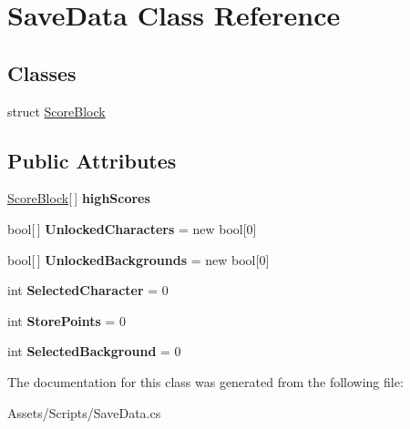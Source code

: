 \hypertarget{class_save_data}{}\section{Save\+Data Class Reference}
\label{class_save_data}
\subsection*{Classes}
\begin{DoxyCompactItemize}
\item 
struct \hyperlink{struct_save_data_1_1_score_block}{Score\+Block}
\end{DoxyCompactItemize}
\subsection*{Public Attributes}
\begin{DoxyCompactItemize}
\item 
\hyperlink{struct_save_data_1_1_score_block}{Score\+Block}\mbox{[}$\,$\mbox{]} {\bfseries high\+Scores}\hypertarget{class_save_data_ad6b597fae588561b2cab802255210781}{}\label{class_save_data_ad6b597fae588561b2cab802255210781}

\item 
bool\mbox{[}$\,$\mbox{]} {\bfseries Unlocked\+Characters} = new bool\mbox{[}0\mbox{]}\hypertarget{class_save_data_af0386c50f7a6c086d961118aa6f80b24}{}\label{class_save_data_af0386c50f7a6c086d961118aa6f80b24}

\item 
bool\mbox{[}$\,$\mbox{]} {\bfseries Unlocked\+Backgrounds} = new bool\mbox{[}0\mbox{]}\hypertarget{class_save_data_a6989ed440d66cee33ae1a8501af3d1be}{}\label{class_save_data_a6989ed440d66cee33ae1a8501af3d1be}

\item 
int {\bfseries Selected\+Character} = 0\hypertarget{class_save_data_a6f8a789b4a102c7ae5038ff8a8c86088}{}\label{class_save_data_a6f8a789b4a102c7ae5038ff8a8c86088}

\item 
int {\bfseries Store\+Points} = 0\hypertarget{class_save_data_a96bd1137583a956bca2e7bd26cd11f89}{}\label{class_save_data_a96bd1137583a956bca2e7bd26cd11f89}

\item 
int {\bfseries Selected\+Background} = 0\hypertarget{class_save_data_afc48c9d7e880061617adfc388800f8bb}{}\label{class_save_data_afc48c9d7e880061617adfc388800f8bb}

\end{DoxyCompactItemize}


The documentation for this class was generated from the following file\+:\begin{DoxyCompactItemize}
\item 
Assets/\+Scripts/Save\+Data.\+cs\end{DoxyCompactItemize}
